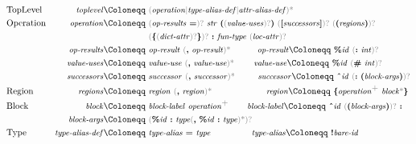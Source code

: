 \begin{figure}
\[\begin{aligned}
&\text{TopLevel}&
\syn{toplevel} \Coloneqq &\ \scmd{(} \syn{operation} \scmd{$\mid$} \syn{type-alias-def} \scmd{$\mid$} \syn{attr-alias-def} \scmd{)*}
\\
&\text{Operation}&
\syn{operation} \Coloneqq &\ \scmd{(} \syn{op-results}\ \tok{=} \scmd{)?}\ \syn{str}\ \tok{(} \scmd{(}\syn{value-uses}\scmd{)?} \tok{)}\ \scmd{(}\tok{[} \syn{successors} \tok{]}\scmd{)?}\ %
\scmd{(}\tok{(} \syn{regions} \tok{)}\scmd{)?}
\\ 
& &
&\ \scmd{(} \tok{\{} \scmd{(}\syn{dict-attr}\scmd{)?} \tok{\}}\scmd{)?}\ \tok{:}\ \syn{fun-type}\ \scmd{(}  \syn{loc-attr} \scmd{)?}
\\
& &
\syn{op-results} \Coloneqq &\ \syn{op-result}\ \scmd{(} \tok{,}\ \syn{op-result} \scmd{)*} \hspace{30pt} \syn{op-result} \Coloneqq \ \tok{\%}\syn{id}\ \scmd{(} \tok{:}\ \syn{int} \scmd{)?}
\\
& &
\syn{value-uses} \Coloneqq &\ \syn{value-use}\ \scmd{(} \tok{,}\ \syn{value-use} \scmd{)*} \hspace{22pt} \syn{value-use} \Coloneqq \ \tok{\%}\syn{id}\ \scmd{(} \tok{\#}\ \syn{int} \scmd{)?}
\\
& &
\syn{successors} \Coloneqq &\ \syn{successor}\ \scmd{(} \tok{,}\ \syn{successor} \scmd{)*} \hspace{26pt} \syn{successor} \Coloneqq \ \tok{\^}\syn{id}\ \scmd{(}\tok{:}\ \tok{(} \syn{block-args} \tok{)} \scmd{)?}
\\
&\text{Region}& \syn{regions} \Coloneqq &\ \syn{region}\ \scmd{(} \tok{,}\ \syn{region} \scmd{)*} \hspace{61pt} \syn{region} \Coloneqq \ \tok{\{} \syn{operation}^\scmd{+}\ \syn{block}\scmd{*} \tok{\}}
\\
&\text{Block}& \syn{block} \Coloneqq &\ \syn{block-label}\ \syn{operation}^\scmd{+} \hspace{21pt} \syn{block-label} \Coloneqq \ \tok{\^}\syn{id} \ \scmd{(} \tok{(} \syn{block-args} \tok{)} \scmd{)?}\ \tok{:}
\\
& &
\syn{block-args} \Coloneqq &\ \scmd{(} \tok{\%}\syn{id}\ \tok{:}\ \syn{type} \scmd{(} \tok{,}\ \tok{\%}\syn{id}\ \tok{:}\ \syn{type} \scmd{)*} \scmd{)?}
\\
&\text{Type}&
\syn{type-alias-def} \Coloneqq &\ \syn{type-alias} \ \tok{=} \ \syn{type} \hspace{46pt} \syn{type-alias} \Coloneqq \ \tok{!}\syn{bare-id}

\end{aligned}\]
\end{figure}
